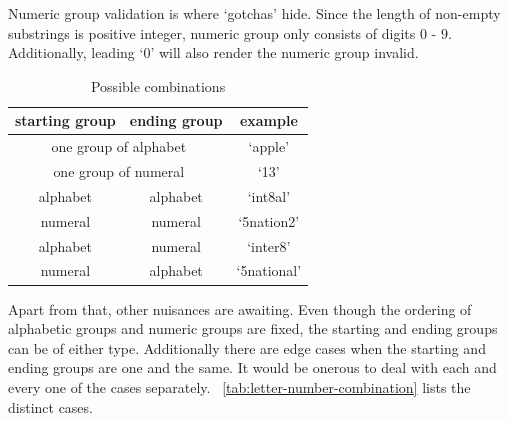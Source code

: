 Numeric group validation is where `gotchas' hide.
Since the length of non-empty substrings is positive integer,
numeric group only consists of digits $0$ - $9$.
Additionally, leading `$0$' will also render the numeric group invalid.

\begin{table}[h]
    \begin{center}
        \caption{Possible combinations
        \label{tab:letter-number-combination}}
        \begin{tabular}{|c|c|c|}
            \hline
            starting group & ending group & example \\
            \hline
            \multicolumn{2}{|c|}{one group of alphabet} & `apple' \\
            \multicolumn{2}{|c|}{one group of numeral} & `13' \\
            alphabet & alphabet & `int8al' \\
            numeral & numeral & `5nation2' \\
            alphabet & numeral & `inter8' \\
            numeral & alphabet & `5national' \\
            \hline
        \end{tabular}
    \end{center}
\end{table}
Apart from that, other nuisances are awaiting.
Even though the ordering of alphabetic groups and numeric groups are fixed,
the starting and ending groups can be of either type.
Additionally there are edge cases when the starting and ending groups are one and the same.
It would be onerous to deal with each and every one of the cases separately.
~\autoref{tab:letter-number-combination} lists the distinct cases.


